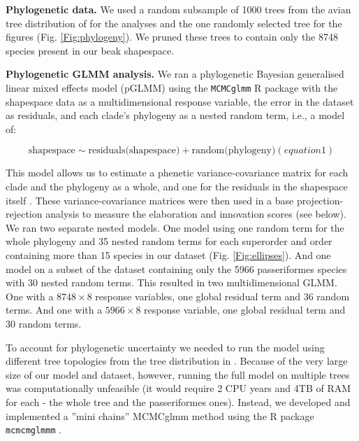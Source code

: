 \documentclass[12pt,letterpaper]{article}
\begin{document}
\textbf{Phylogenetic data.}
We used a random subsample of 1000 trees from the avian tree distribution of \cite{jetz2012global} for the analyses and the one randomly selected tree for the figures (Fig. \ref{Fig:phylogeny}).
We pruned these trees to contain only the 8748 species present in our beak shapespace.




\textbf{Phylogenetic GLMM analysis.}
We ran a phylogenetic Bayesian generalised linear mixed effects model (pGLMM) using the \texttt{MCMCglmm} R package \cite{MCMCglmm} with the shapespace data as a multidimensional response variable, the error in the dataset as residuals, and each clade's phylogeny as a nested random term, i.e., a model of:

\begin{equation}
\text{shapespace} \mathtt{\sim} \text{residuals(shapespace)} + \text{random(phylogeny)} (equation 1)
\end{equation}

This model allows us to estimate a phenetic variance-covariance matrix for each clade and the phylogeny as a whole, and one for the residuals in the shapespace itself \cite{robinson2013quantifying}.
These variance-covariance matrices were then used in a base projection-rejection analysis to measure the elaboration and innovation scores (see below).
We ran two separate nested models.
One model using one random term for the whole phylogeny and 35 nested random terms for each superorder and order containing more than 15 species in our dataset (Fig. \ref{Fig:ellipses}).
And one model on a subset of the dataset containing only the 5966 passeriformes species with 30 nested random terms.
This resulted in two multidimensional GLMM.
One with a $8748 \times 8$ response variables, one global residual term and 36 random terms.
And one with a $5966 \times 8$ response variable, one global residual term and 30 random terms.
 
To account for phylogenetic uncertainty we needed to run the model using different tree topologies from the tree distribution in \cite{jetz2012global}.
Because of the very large size of our model and dataset, however, running the full model on multiple trees was computationally unfeasible (it would require 2 CPU years and 4TB of RAM for each - the whole tree and the passeriformes ones).
Instead, we developed and implemented a ''mini chains'' MCMCglmm method using the R package \texttt{mcmcmglmmm} \cite{mcmcmcglmmm}.
\end{document}
